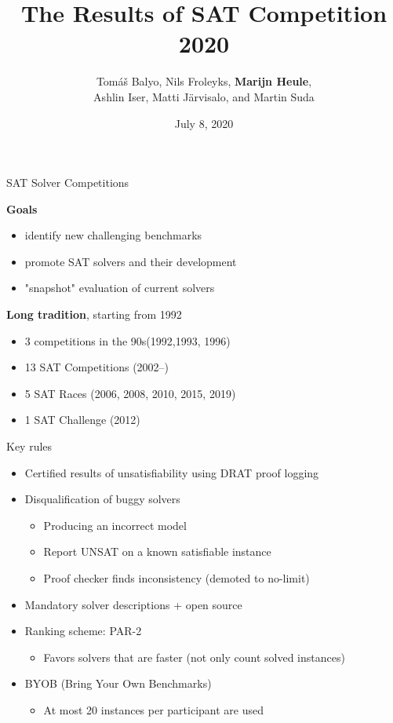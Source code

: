 \documentclass{beamer}
\title[SAT Competition 2020]{The Results of SAT Competition 2020}
\author[Balyo, Froleyks, Heule, Iser, J\"{a}rvisalo, Suda] {Tom{\'a}{\v s} Balyo, Nils Froleyks, {\bf Marijn Heule},\\
Ashlin Iser, Matti J\"{a}rvisalo, and Martin Suda}
\institute[] %
{
SAT 2020 Conference, Alghero, Italy (virtually) \\ %
}
\date{July 8, 2020} %
\begin{document}
\begin{frame}
\titlepage %
\end{frame}

\begin{frame}{SAT Solver Competitions}

{\bf Goals}
\begin{itemize}
\item identify new challenging benchmarks
\item promote SAT solvers and their development
\item "snapshot" evaluation of current solvers
\end{itemize}

\bigskip

{\bf Long tradition}, starting from 1992
\begin{itemize}
\item 3 competitions in the 90s\hfill (1992,1993, 1996)
\item 13 SAT Competitions \hfill (2002--)
\item 5 SAT Races \hfill (2006, 2008, 2010, 2015, 2019)
\item 1 SAT Challenge \hfill (2012)
\end{itemize}

\end{frame}


\begin{frame}{Key rules}

\begin{itemize}
\item Certified results of unsatisfiability using DRAT proof logging
\medskip
\item Disqualification of buggy solvers
  \begin{itemize}
  \item Producing an incorrect model
  \item Report UNSAT on a known satisfiable instance
  \item Proof checker finds inconsistency (demoted to no-limit)
  \end{itemize}
\medskip
\item Mandatory solver descriptions + open source
\medskip
\item Ranking scheme: PAR-2
\begin{itemize}
\item Favors solvers that are faster (not only count solved instances)
\end{itemize}
\medskip
\item BYOB (Bring Your Own Benchmarks)
\begin{itemize}
\item At most 20 instances per participant are used
\end{itemize} 
\end{itemize}

\end{frame}
\end{document}
